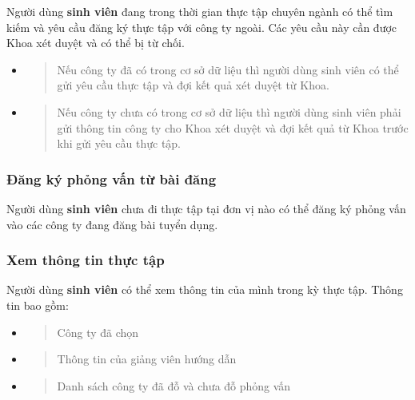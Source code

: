 \documentclass[./../main.tex]{subfiles}
\begin{document}
Người dùng \textbf{sinh viên} đang trong thời gian thực tập chuyên ngành
có thể tìm kiếm và yêu cầu đăng ký thực tập với công ty ngoài. Các yêu
cầu này cần được Khoa xét duyệt và có thể bị từ chối.
  
\begin{itemize}
	\item
	      \begin{quote}
	      	Nếu công ty đã có trong cơ sở dữ liệu thì người dùng sinh viên có thể
	      	gửi yêu cầu thực tập và đợi kết quả xét duyệt từ Khoa.
	      \end{quote}
	\item
	      \begin{quote}
	      	Nếu công ty chưa có trong cơ sở dữ liệu thì người dùng sinh viên phải
	      	gửi thông tin công ty cho Khoa xét duyệt và đợi kết quả từ Khoa trước
	      	khi gửi yêu cầu thực tập.
	      \end{quote}
\end{itemize}
  
\hypertarget{ux111ux103ng-kuxfd-phux1ecfng-vux1ea5n-tux1eeb-buxe0i-ux111ux103ng}{%
	\subsubsection{Đăng ký phỏng vấn từ bài
		đăng}\label{ux111ux103ng-kuxfd-phux1ecfng-vux1ea5n-tux1eeb-buxe0i-ux111ux103ng}}
  
Người dùng \textbf{sinh viên} chưa đi thực tập tại đơn vị nào có thể
đăng ký phỏng vấn vào các công ty đang đăng bài tuyển dụng.
  
\hypertarget{xem-thuxf4ng-tin-thux1ef1c-tux1eadp}{%
	\subsubsection{Xem thông tin thực
		tập}\label{xem-thuxf4ng-tin-thux1ef1c-tux1eadp}}
  
Người dùng \textbf{sinh viên} có thể xem thông tin của mình trong kỳ
thực tập. Thông tin bao gồm:
  
\begin{itemize}
	\item
	      \begin{quote}
	      	Công ty đã chọn
	      \end{quote}
	\item
	      \begin{quote}
	      	Thông tin của giảng viên hướng dẫn
	      \end{quote}
	\item
	      \begin{quote}
	      	Danh sách công ty đã đỗ và chưa đỗ phỏng vấn
	      \end{quote}
\end{itemize}
  
\end{document}
